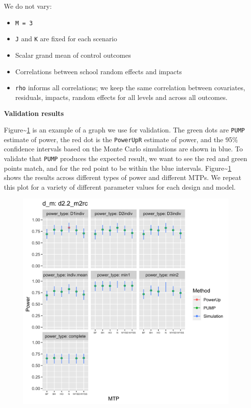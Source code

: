 \documentclass[
]{article}
\providecommand{\tightlist}{%
  \setlength{\itemsep}{0pt}\setlength{\parskip}{0pt}}
\begin{document}
We do not vary:

\begin{itemize}
\tightlist
\item
  \texttt{M\ =\ 3}
\item
  \texttt{J} and \texttt{K} are fixed for each scenario
\item
  Scalar grand mean of control outcomes
\item
  Correlations between school random effects and impacts
\item
  \texttt{rho} informs all correlations; we keep the same correlation
  between covariates, residuals, impacts, random effects for all levels
  and across all outcomes.
\end{itemize}

\textbf{Validation results}

Figure\textasciitilde{}\ref{fig:validate} is an example of a graph we
use for validation. The green dots are \texttt{PUMP} estimate of power,
the red dot is the \texttt{PowerUpR} estimate of power, and the 95\%
confidence intervals based on the Monte Carlo simulations are shown in
blue. To validate that \texttt{PUMP} produces the expected result, we
want to see the red and green points match, and for the red point to be
within the blue intervals. Figure\textasciitilde{}\ref{fig:validate}
shows the results across different types of power and different MTPs. We
repeat this plot for a variety of different parameter values for each
design and model.

\begin{figure}[h!]
\centering
  \includegraphics[width=6in]{example_validation_plot.png}
  \label{fig:validate}
\end{figure}
\end{document}
